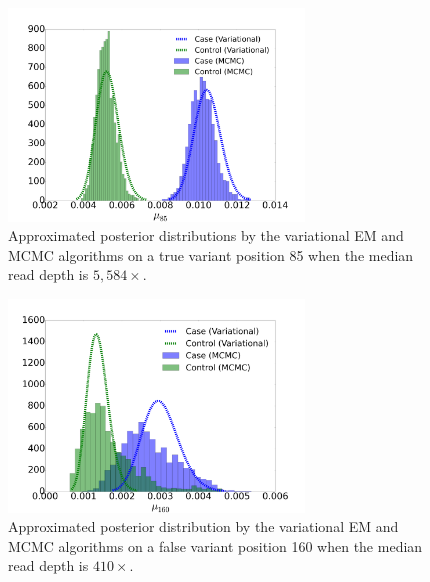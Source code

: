 \documentclass[11pt,reqno]{amsart}
\begin{document}
\begin{figure}[htbp]
\centering
\includegraphics[width=0.7\textwidth]{figs/position_85_5584_mcmc_vs_var_mu_fig1.png}
\caption{Approximated posterior distributions by the variational EM and MCMC algorithms on a true variant position 85 when the median read depth is $5,584\times$.}
\label{tbl:compare1}
\end{figure}
\begin{figure}[htbp]
\centering
\includegraphics[width=0.7\textwidth]{figs/position_160_410_mcmc_vs_var_mu_fig2.png}
\caption{Approximated posterior distribution by the variational EM and MCMC algorithms on a false variant position 160 when the median read depth is $410\times$.}
\label{tbl:compare2}
\end{figure}
\end{document}

